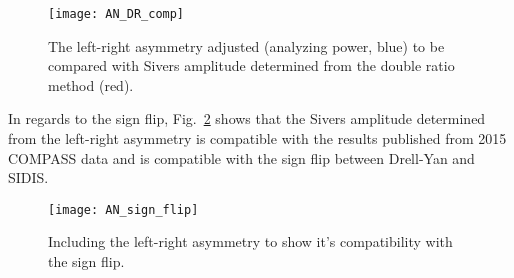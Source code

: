\begin{figure}[h!t]
  \centering \texttt{[image: AN\_DR\_comp]}
  \caption{The left-right asymmetry adjusted (analyzing power, blue) to be
    compared with Sivers amplitude determined from the double ratio method
    (red).}
  \label{fig::AN_DR_comp}
\end{figure}

In regards to the sign flip, Fig.~\ref{fig::AN_sign_flip} shows that the Sivers
amplitude determined from the left-right asymmetry is compatible with the
results published from 2015 COMPASS data and is compatible with the sign flip
between Drell-Yan and SIDIS.

\begin{figure}[h!t]
  \centering
  \texttt{[image: AN\_sign\_flip]}
  \caption{Including the left-right asymmetry to show it's compatibility with
    the sign flip.}
  \label{fig::AN_sign_flip}
\end{figure}
